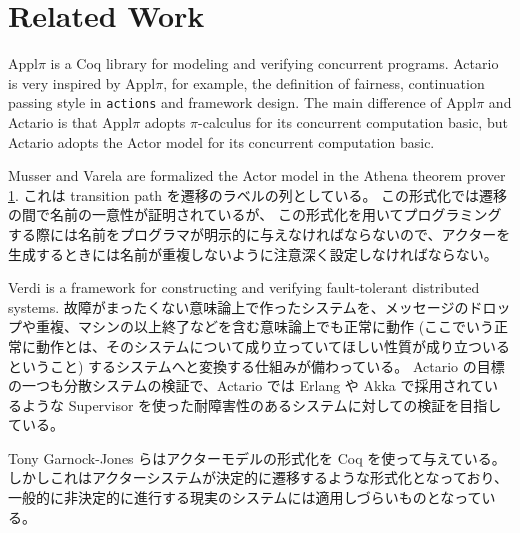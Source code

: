 \section{Related Work}

Appl\(\pi\) is a Coq library for modeling and verifying concurrent programs.
Actario is very inspired by Appl\(\pi\), for example, the definition of fairness, continuation passing style in \texttt{actions} and framework design.
The main difference of Appl\(\pi\) and Actario is that Appl\(\pi\) adopts \(\pi\)-calculus for its concurrent computation basic, but Actario adopts the Actor model for its concurrent computation basic.

Musser and Varela are formalized the Actor model in the Athena theorem prover \ref{}.
これは transition path を遷移のラベルの列としている。
この形式化では遷移の間で名前の一意性が証明されているが、 %
この形式化を用いてプログラミングする際には名前をプログラマが明示的に与えなければならないので、アクターを生成するときには名前が重複しないように注意深く設定しなければならない。

Verdi is a framework for constructing and verifying fault-tolerant distributed systems.
故障がまったくない意味論上で作ったシステムを、メッセージのドロップや重複、マシンの以上終了などを含む意味論上でも正常に動作 (ここでいう正常に動作とは、そのシステムについて成り立っていてほしい性質が成り立ついるということ) するシステムへと変換する仕組みが備わっている。
Actario の目標の一つも分散システムの検証で、Actario では Erlang や Akka で採用されているような Supervisor を使った耐障害性のあるシステムに対しての検証を目指している。

Tony Garnock-Jones らはアクターモデルの形式化を Coq を使って与えている。
しかしこれはアクターシステムが決定的に遷移するような形式化となっており、一般的に非決定的に進行する現実のシステムには適用しづらいものとなっている。
